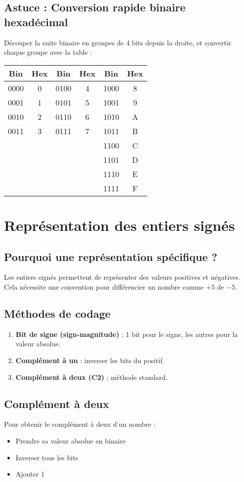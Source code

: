 \documentclass[12pt,a4paper]{article}
\begin{document}
\subsection{Astuce : Conversion rapide binaire \textrightarrow{} hexadécimal}
Découper la suite binaire en groupes de 4 bits depuis la droite, et convertir chaque groupe avec la table :
\begin{tabular}{|c|c|c|c|c|c|}
\hline
Bin & Hex & Bin & Hex & Bin & Hex \\
\hline
0000 & 0 & 0100 & 4 & 1000 & 8 \\
0001 & 1 & 0101 & 5 & 1001 & 9 \\
0010 & 2 & 0110 & 6 & 1010 & A \\
0011 & 3 & 0111 & 7 & 1011 & B \\
     &   &      &   & 1100 & C \\
     &   &      &   & 1101 & D \\
     &   &      &   & 1110 & E \\
     &   &      &   & 1111 & F \\
\hline
\end{tabular}

\newpage
\section{Représentation des entiers signés}

\subsection{Pourquoi une représentation spécifique ?}
Les entiers signés permettent de représenter des valeurs positives et négatives. Cela nécessite une convention pour différencier un nombre comme $+5$ de $-5$.

\subsection{Méthodes de codage}
\begin{enumerate}
  \item \textbf{Bit de signe (sign-magnitude)} : 1 bit pour le signe, les autres pour la valeur absolue.
  \item \textbf{Complément à un} : inverser les bits du positif.
  \item \textbf{Complément à deux (C2)} : méthode standard.
\end{enumerate}

\subsection{Complément à deux}
Pour obtenir le complément à deux d’un nombre :
\begin{itemize}
  \item Prendre sa valeur absolue en binaire
  \item Inverser tous les bits
  \item Ajouter 1
\end{itemize}
\end{document}
